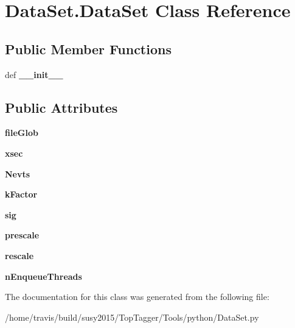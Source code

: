 \hypertarget{classDataSet_1_1DataSet}{\section{Data\-Set.\-Data\-Set Class Reference}
\label{classDataSet_1_1DataSet}
}
\subsection*{Public Member Functions}
\begin{DoxyCompactItemize}
\item 
\hypertarget{classDataSet_1_1DataSet_ae3eb8140a6a2ff62586c52158cb4cf21}{def {\bfseries \-\_\-\-\_\-init\-\_\-\-\_\-}}\label{classDataSet_1_1DataSet_ae3eb8140a6a2ff62586c52158cb4cf21}

\end{DoxyCompactItemize}
\subsection*{Public Attributes}
\begin{DoxyCompactItemize}
\item 
\hypertarget{classDataSet_1_1DataSet_a31312e7ebc75a63846784ead3f5cf8d1}{{\bfseries file\-Glob}}\label{classDataSet_1_1DataSet_a31312e7ebc75a63846784ead3f5cf8d1}

\item 
\hypertarget{classDataSet_1_1DataSet_ada08c6b544a58467403e9ab421057b5f}{{\bfseries xsec}}\label{classDataSet_1_1DataSet_ada08c6b544a58467403e9ab421057b5f}

\item 
\hypertarget{classDataSet_1_1DataSet_a69beaca98bb3ebb6061af614c70c5a80}{{\bfseries Nevts}}\label{classDataSet_1_1DataSet_a69beaca98bb3ebb6061af614c70c5a80}

\item 
\hypertarget{classDataSet_1_1DataSet_a6813ebb37a959a59becf21a06fda7e1f}{{\bfseries k\-Factor}}\label{classDataSet_1_1DataSet_a6813ebb37a959a59becf21a06fda7e1f}

\item 
\hypertarget{classDataSet_1_1DataSet_aadcca5cbd9d7962486695097ea39f34b}{{\bfseries sig}}\label{classDataSet_1_1DataSet_aadcca5cbd9d7962486695097ea39f34b}

\item 
\hypertarget{classDataSet_1_1DataSet_a483dac2804e4ea9d834d944ba9d5664e}{{\bfseries prescale}}\label{classDataSet_1_1DataSet_a483dac2804e4ea9d834d944ba9d5664e}

\item 
\hypertarget{classDataSet_1_1DataSet_ac5ea1a521dbffb539f7ccce804b64393}{{\bfseries rescale}}\label{classDataSet_1_1DataSet_ac5ea1a521dbffb539f7ccce804b64393}

\item 
\hypertarget{classDataSet_1_1DataSet_a290520ed790c13b0b0eb84a3530f9167}{{\bfseries n\-Enqueue\-Threads}}\label{classDataSet_1_1DataSet_a290520ed790c13b0b0eb84a3530f9167}

\end{DoxyCompactItemize}


The documentation for this class was generated from the following file\-:\begin{DoxyCompactItemize}
\item 
/home/travis/build/susy2015/\-Top\-Tagger/\-Tools/python/Data\-Set.\-py\end{DoxyCompactItemize}
